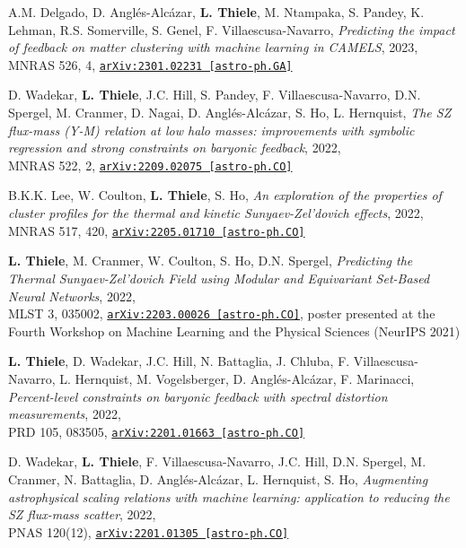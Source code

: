 A.M. Delgado, D. Angl\'es-Alc\'azar, {\bf L. Thiele}, M. Ntampaka, S. Pandey,
K. Lehman, R.S. Somerville, S. Genel, F. Villaescusa-Navarro,
\emph{Predicting the impact of feedback on matter clustering with machine learning
      in CAMELS}, 2023,\\
MNRAS 526, 4,
\href{https://arxiv.org/abs/2301.02231}{\mbox{\texttt{arXiv:2301.02231 [astro-ph.GA]}}}

D. Wadekar, {\bf L. Thiele}, J.C. Hill, S. Pandey, F. Villaescusa-Navarro,
D.N. Spergel, M. Cranmer, D. Nagai, D. Angl\'es-Alc\'azar, S. Ho, L. Hernquist,
\emph{The SZ flux-mass (Y-M) relation at low halo masses: improvements with
      symbolic regression and strong constraints on baryonic feedback}, 2022,\\
MNRAS 522, 2,
\href{https://arxiv.org/abs/2209.02075}{\mbox{\texttt{arXiv:2209.02075 [astro-ph.CO]}}}

\newpage
\vspace*{0.5cm}

B.K.K. Lee, W. Coulton, {\bf L. Thiele}, S. Ho,
\emph{An exploration of the properties of cluster profiles for the thermal
      and kinetic Sunyaev-Zel'dovich effects}, 2022,\\
MNRAS 517, 420,
\href{https://arxiv.org/abs/2205.01710}{\mbox{\texttt{arXiv:2205.01710 [astro-ph.CO]}}}

{\bf L. Thiele}, M. Cranmer, W. Coulton, S. Ho, D.N. Spergel,
\emph{Predicting the Thermal Sunyaev-Zel'dovich Field
      using Modular and Equivariant Set-Based Neural Networks}, 2022,\\
MLST 3, 035002,
\href{https://arxiv.org/abs/2203.00026}{\mbox{\texttt{arXiv:2203.00026 [astro-ph.CO]}}},
poster presented at the Fourth Workshop on Machine Learning and the Physical Sciences (NeurIPS 2021)

{\bf L. Thiele}, D. Wadekar, J.C. Hill, N. Battaglia, J. Chluba,
F. Villaescusa-Navarro, L. Hernquist, M. Vogelsberger, D. Angl\'es-Alc\'azar,
F. Marinacci,
\emph{Percent-level constraints on baryonic feedback with spectral distortion
      measurements}, 2022,\\
PRD 105, 083505,
\href{https://arxiv.org/abs/2201.01663}{\mbox{\texttt{arXiv:2201.01663 [astro-ph.CO]}}}

D. Wadekar, {\bf L. Thiele}, F. Villaescusa-Navarro, J.C. Hill, D.N. Spergel,
M. Cranmer, N. Battaglia, D. Angl\'es-Alc\'azar, L. Hernquist, S. Ho,
\emph{Augmenting astrophysical scaling relations with machine learning:
      application to reducing the SZ flux-mass scatter}, 2022,\\
PNAS 120(12),
\href{https://arxiv.org/abs/2201.01305}{\mbox{\texttt{arXiv:2201.01305 [astro-ph.CO]}}}

